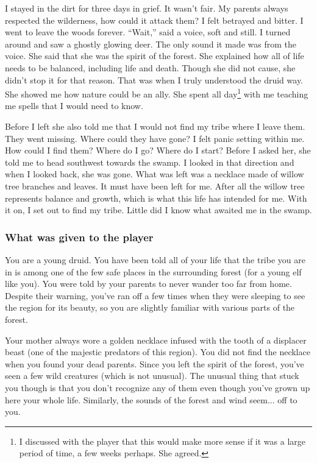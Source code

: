 I stayed in the dirt for three days in grief. It wasn't fair. My parents always respected the wilderness, how could it attack them? I felt betrayed and bitter. I went to leave the woods forever. “Wait,” said a voice, soft and still. I turned around and saw a ghostly glowing deer. The only sound it made was from the voice. She said that she was the spirit of the forest. She explained how all of life needs to be balanced, including life and death. Though she did not cause, she didn't stop it for that reason. That was when I truly understood the druid way. She showed me how nature could be an ally. She spent all day\footnote{I discussed with the player that this would make more sense if it was a large period of time, a few weeks perhaps. She agreed.} with me teaching me spells that I would need to know. 

Before I left she also told me that I would not find my tribe where I leave them. They went missing. Where could they have gone? I felt panic setting within me. How could I find them? Where do I go? Where do I start? Before I asked her, she told me to head southwest towards the swamp. I looked in that direction and when I looked back, she was gone. What was left was a necklace made of willow tree branches and leaves. It must have been left for me. After all the willow tree represents balance and growth, which is what this life has intended for me. With it on, I set out to find my tribe. Little did I know what awaited me in the swamp.

\subsubsection{What was given to the player}

You are a young druid. You have been told all of your life that the tribe you are in is among one of the few safe places in the surrounding forest (for a young elf like you). You were told by your parents to never wander too far from home. Despite their warning, you've ran off a few times when they were sleeping to see the region for its beauty, so you are slightly familiar with various parts of the forest.

Your mother always wore a golden necklace infused with the tooth of a displacer beast (one of the majestic predators of this region). You did not find the necklace when you found your dead parents. Since you left the spirit of the forest, you've seen a few wild creatures (which is not unusual). The unusual thing that stuck you though is that you don't recognize any of them even though you've grown up here your whole life. Similarly, the sounds of the forest and wind seem... off to you. 

